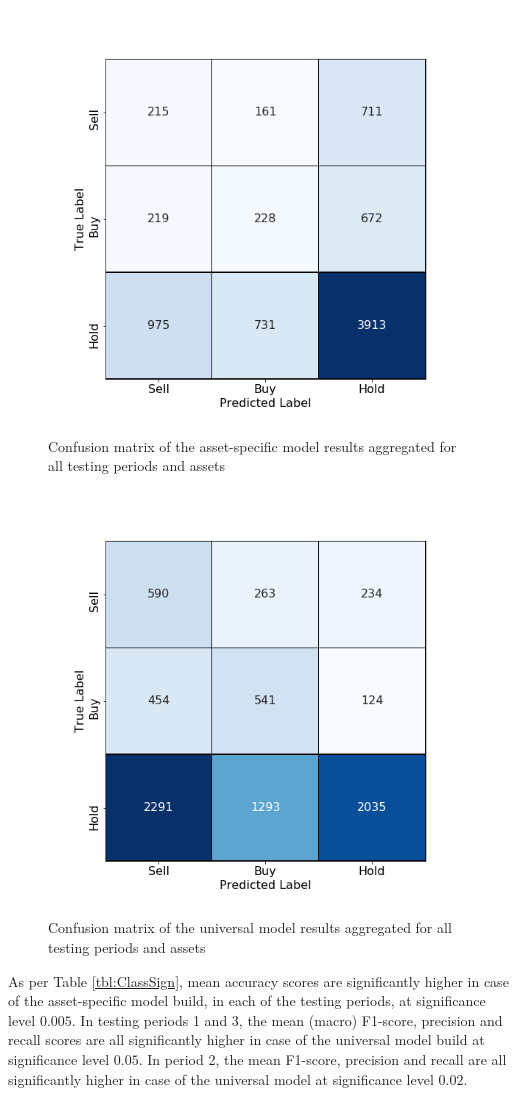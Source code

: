 \documentclass[11pt, a4paper]{article}
\begin{document}
\begin{figure}[H]
    \centering
    \includegraphics[width=.62\textwidth]{images/CMs/CM_indiv_aggreg.png}
    \caption{Confusion matrix of the asset-specific model results aggregated for all testing periods and assets}
    \label{fig:CMAggrI}
\end{figure}

\begin{figure}[H]
    \centering
    \includegraphics[width=.62\textwidth]{images/CMs/CM_univ_aggreg.png}
    \caption{Confusion matrix of the universal model results aggregated for all testing periods and assets}
    \label{fig:CMAggrU}
\end{figure}

As per Table \ref{tbl:ClassSign}, mean accuracy scores are significantly higher in case of the asset-specific model build, in each of the testing periods, at significance level $0.005$. In testing periods 1 and 3, the mean (macro) F1-score, precision and recall scores are all significantly higher in case of the universal model build at significance level $0.05$. In period 2, the mean F1-score, precision and recall are all significantly higher in case of the universal model at significance level $0.02$. 
\end{document}
